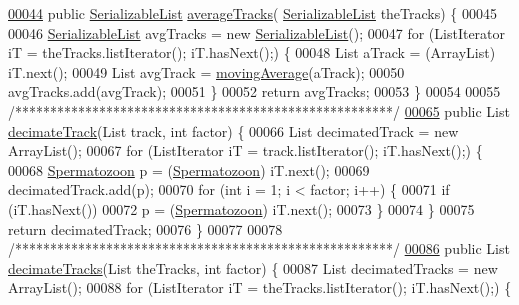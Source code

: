 \begin{DoxyCode}
\hypertarget{_signal_processing_8java_source_l00044}{}\hyperlink{classfunctions_1_1_signal_processing_abf1074d52caa632088bc9c8f12f8ee53}{00044}   \textcolor{keyword}{public} \hyperlink{classdata_1_1_serializable_list}{SerializableList} \hyperlink{classfunctions_1_1_signal_processing_abf1074d52caa632088bc9c8f12f8ee53}{averageTracks}(
      \hyperlink{classdata_1_1_serializable_list}{SerializableList} theTracks) \{
00045 
00046     \hyperlink{classdata_1_1_serializable_list}{SerializableList} avgTracks = \textcolor{keyword}{new} \hyperlink{classdata_1_1_serializable_list}{SerializableList}();
00047     \textcolor{keywordflow}{for} (ListIterator iT = theTracks.listIterator(); iT.hasNext();) \{
00048       List aTrack = (ArrayList) iT.next();
00049       List avgTrack = \hyperlink{classfunctions_1_1_signal_processing_a4f10245c50d850b87d1ef4d81c28300d}{movingAverage}(aTrack);
00050       avgTracks.add(avgTrack);
00051     \}
00052     \textcolor{keywordflow}{return} avgTracks;
00053   \}
00054 
00055   \textcolor{comment}{/******************************************************/}
\hypertarget{_signal_processing_8java_source_l00065}{}\hyperlink{classfunctions_1_1_signal_processing_ab5068ef8536594355df9d576ba97dd57}{00065}   \textcolor{keyword}{public} List \hyperlink{classfunctions_1_1_signal_processing_ab5068ef8536594355df9d576ba97dd57}{decimateTrack}(List track, \textcolor{keywordtype}{int} factor) \{
00066     List decimatedTrack = \textcolor{keyword}{new} ArrayList();
00067     \textcolor{keywordflow}{for} (ListIterator iT = track.listIterator(); iT.hasNext();) \{
00068       \hyperlink{classdata_1_1_spermatozoon}{Spermatozoon} p = (\hyperlink{classdata_1_1_spermatozoon}{Spermatozoon}) iT.next();
00069       decimatedTrack.add(p);
00070       \textcolor{keywordflow}{for} (\textcolor{keywordtype}{int} i = 1; i < factor; i++) \{
00071         \textcolor{keywordflow}{if} (iT.hasNext())
00072           p = (\hyperlink{classdata_1_1_spermatozoon}{Spermatozoon}) iT.next();
00073       \}
00074     \}
00075     \textcolor{keywordflow}{return} decimatedTrack;
00076   \}
00077 
00078   \textcolor{comment}{/******************************************************/}
\hypertarget{_signal_processing_8java_source_l00086}{}\hyperlink{classfunctions_1_1_signal_processing_a3681b0de9ff6ff95edd91bab486627e5}{00086}   \textcolor{keyword}{public} List \hyperlink{classfunctions_1_1_signal_processing_a3681b0de9ff6ff95edd91bab486627e5}{decimateTracks}(List theTracks, \textcolor{keywordtype}{int} factor) \{
00087     List decimatedTracks = \textcolor{keyword}{new} ArrayList();
00088     \textcolor{keywordflow}{for} (ListIterator iT = theTracks.listIterator(); iT.hasNext();) \{

\end{DoxyCode}
